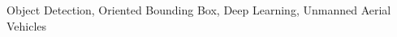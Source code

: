 \begin{abstract}
    
   


\end{abstract}

\begin{IEEEkeywords}
	Object Detection, Oriented Bounding Box, Deep Learning, Unmanned Aerial Vehicles
\end{IEEEkeywords}